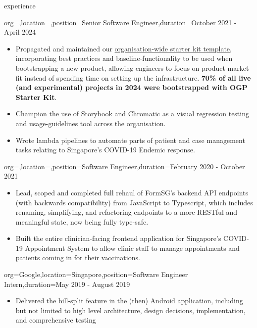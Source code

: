 \documentclass{resume}
\begin{document}
\begin{ResumeSection}{experience}
\begin{ResumeSubsection}{org=,location=,position={Senior Software Engineer},duration=October 2021 - April 2024}
\begin{itemize}
            \item Propagated and maintained our \href{https://start.open.gov.sg/}{organisation-wide starter kit template}, incorporating best practices and baseline-functionality to be used when bootstrapping a new product, allowing engineers to focus on product market fit instead of spending time on setting up the infrastructure. \textbf{70\% of all live (and experimental) projects in 2024 were bootstrapped with OGP Starter Kit}.
            \item Champion the use of Storybook and Chromatic as a visual regression testing and usage-guidelines tool across the organisation.
            \item Wrote lambda pipelines to automate parts of patient and case management tasks relating to Singapore’s COVID-19 Endemic response.
        \end{itemize}
        \medskip
    \end{ResumeSubsection}
    \begin{ResumeSubsection}{org=,location=,position={Software Engineer},duration=February 2020 - October 2021}
        \begin{itemize}
            \item Lead, scoped and completed full rehaul of FormSG’s backend API endpoints (with backwards compatibility) from JavaScript to Typescript, which includes renaming, simplifying, and refactoring endpoints to a more RESTful and meaningful state, now being fully type-safe.
            \item Built the entire clinician-facing frontend application for Singapore’s COVID-19 Appointment System to allow clinic staff to manage appointments and patients coming in for their vaccinations.
        \end{itemize}
        \bigskip
    \end{ResumeSubsection}
    \begin{ResumeSubsection}{org=Google,location={Singapore},position={Software Engineer Intern},duration=May 2019 - August 2019}
        \begin{itemize} 
            \item Delivered the bill-split feature in the (then) Android application, including but not limited to high level architecture, design decisions, implementation, and comprehensive testing
        \end{itemize}
        \bigskip
    \end{ResumeSubsection}
\end{ResumeSection}
\end{document}
